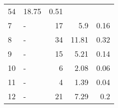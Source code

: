 \begin{longtable}{lXrrr}
       \num{54} &
       \num[round-mode=places,round-precision=2]{18,75} &
         \num[round-mode=places,round-precision=2]{0,51} \\

     7 &
     \multicolumn{1}{X}{ -  } &


       \num{17} &
       \num[round-mode=places,round-precision=2]{5,9} &
         \num[round-mode=places,round-precision=2]{0,16} \\

     8 &
     \multicolumn{1}{X}{ -  } &


       \num{34} &
       \num[round-mode=places,round-precision=2]{11,81} &
         \num[round-mode=places,round-precision=2]{0,32} \\

     9 &
     \multicolumn{1}{X}{ -  } &


       \num{15} &
       \num[round-mode=places,round-precision=2]{5,21} &
         \num[round-mode=places,round-precision=2]{0,14} \\

     10 &
     \multicolumn{1}{X}{ -  } &


       \num{6} &
       \num[round-mode=places,round-precision=2]{2,08} &
         \num[round-mode=places,round-precision=2]{0,06} \\

     11 &
     \multicolumn{1}{X}{ -  } &


       \num{4} &
       \num[round-mode=places,round-precision=2]{1,39} &
         \num[round-mode=places,round-precision=2]{0,04} \\

     12 &
     \multicolumn{1}{X}{ -  } &


       \num{21} &
       \num[round-mode=places,round-precision=2]{7,29} &
         \num[round-mode=places,round-precision=2]{0,2} \\


\end{longtable}
